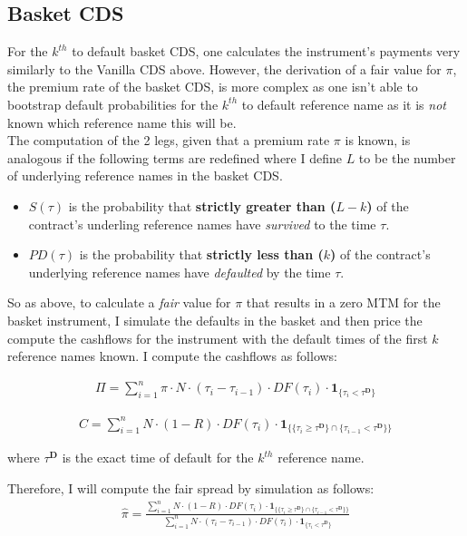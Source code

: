 \documentclass{report}
\theoremstyle{plain}
\theoremstyle{definition}
\begin{document}
\subsection{Basket CDS}
For the $k^{th}$ to default basket CDS, one calculates the instrument's payments very similarly to the Vanilla CDS above. However, the derivation of a fair value for $\pi$, the premium rate of the basket CDS, is more complex as one isn't able to bootstrap default probabilities for the $k^{th}$ to default reference name as it is \emph{not} known which reference name this will be.\\

The computation of the 2 legs, given that a premium rate $\pi$ is known, is analogous if the following terms are redefined where I define $L$ to be the number of underlying reference names in the basket CDS.

\begin{itemize}
	\item $S(\tau)$ is the probability that \textbf{strictly greater than ($L - k$)} of the contract's underling reference names have \emph{survived} to the time $\tau$.
	\item $PD(\tau)$ is the probability that \textbf{strictly less than ($k$)} of the contract's underlying reference names have \emph{defaulted} by the time $\tau$.
\end{itemize}

So as above, to calculate a \textit{fair} value for $\pi$ that results in a zero MTM for the basket instrument, I simulate the defaults in the basket and then price the compute the cashflows for the instrument with the default times of the first $k$ reference names known. I compute the cashflows as follows:

\begin{align*}
\Pi = \sum_{i=1}^{n}\pi \cdot N \cdot (\tau_i - \tau_{i-1}) \cdot DF(\tau_i) \cdot \mathbf{1}_{\{\tau_i < \tau^{\mathbf{D}} \}}
\end{align*}

\begin{align*}
C = \sum_{i=1}^{n} N \cdot (1-R) \cdot DF(\tau_i) \cdot \mathbf{1}_{\{\{\tau_i \geq \tau^{\mathbf{D}}\} \cap \{\tau_{i-1} < \tau^{\mathbf{D}} \}\}}
\end{align*}

where $\tau^{\mathbf{D}}$ is the exact time of default for the $k^{th}$ reference name.

Therefore, I will compute the fair spread by simulation as follows: 
\begin{align*}
\hat{\pi} = \frac{\sum_{i=1}^{n} N \cdot (1-R) \cdot DF(\tau_i) \cdot \mathbf{1}_{\{\{\tau_i \geq \tau^{\mathbf{D}}\} \cap \{\tau_{i-1} < \tau^{\mathbf{D}} \}\}}}{\sum_{i=1}^{n} N \cdot (\tau_i - \tau_{i-1}) \cdot DF(\tau_i) \cdot \mathbf{1}_{\{\tau_i < \tau^{\mathbf{D}} \}}}
\end{align*}
\end{document}
